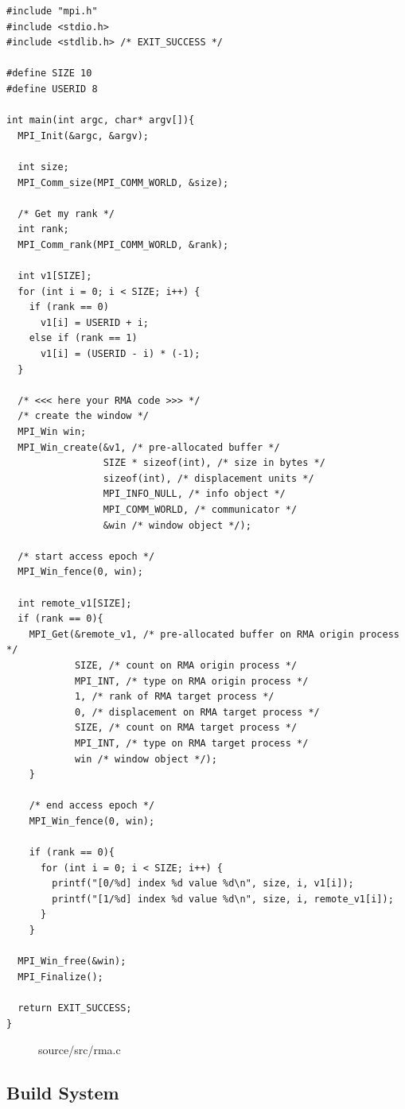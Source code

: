 \documentclass[12pt]{article}
\begin{document}
\begin{verbatim}
#include "mpi.h"
#include <stdio.h>
#include <stdlib.h> /* EXIT_SUCCESS */

#define SIZE 10
#define USERID 8

int main(int argc, char* argv[]){
  MPI_Init(&argc, &argv);

  int size;
  MPI_Comm_size(MPI_COMM_WORLD, &size);

  /* Get my rank */
  int rank;
  MPI_Comm_rank(MPI_COMM_WORLD, &rank);

  int v1[SIZE];
  for (int i = 0; i < SIZE; i++) {
    if (rank == 0) 
      v1[i] = USERID + i;   
    else if (rank == 1)
      v1[i] = (USERID - i) * (-1);   
  }

  /* <<< here your RMA code >>> */
  /* create the window */
  MPI_Win win;
  MPI_Win_create(&v1, /* pre-allocated buffer */
                 SIZE * sizeof(int), /* size in bytes */
                 sizeof(int), /* displacement units */
                 MPI_INFO_NULL, /* info object */
                 MPI_COMM_WORLD, /* communicator */
                 &win /* window object */);

  /* start access epoch */
  MPI_Win_fence(0, win);

  int remote_v1[SIZE];
  if (rank == 0){
    MPI_Get(&remote_v1, /* pre-allocated buffer on RMA origin process */
            SIZE, /* count on RMA origin process */
            MPI_INT, /* type on RMA origin process */
            1, /* rank of RMA target process */
            0, /* displacement on RMA target process */
            SIZE, /* count on RMA target process */
            MPI_INT, /* type on RMA target process */
            win /* window object */);
    }

    /* end access epoch */
    MPI_Win_fence(0, win);

    if (rank == 0){
      for (int i = 0; i < SIZE; i++) {
        printf("[0/%d] index %d value %d\n", size, i, v1[i]);
        printf("[1/%d] index %d value %d\n", size, i, remote_v1[i]);
      }
    }

  MPI_Win_free(&win);
  MPI_Finalize();

  return EXIT_SUCCESS;
}
\end{verbatim}

\begin{figure}[h!]
\caption{source/src/rma.c}\label{code:rmac}
\end{figure}

\newpage

\subsection*{Build System}
\end{document}
